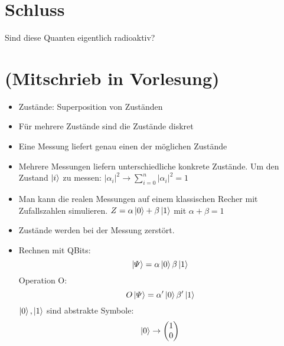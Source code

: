 \chapter{Schluss}
Sind diese Quanten eigentlich radioaktiv?
\chapter{(Mitschrieb in Vorlesung)}
\begin{itemize}
\item Zustände: Superposition von Zuständen
\item Für mehrere Zustände sind die Zustände diskret
\item Eine Messung liefert genau einen der möglichen Zustände
\item Mehrere Messungen liefern unterschiedliche konkrete Zustände. Um den Zustand $\ket{i}$ zu messen: $\left\lvert \alpha_i \right\rvert ^2 \rightarrow \sum_{i = 0}^{n} \left\lvert \alpha_i \right\rvert ^2 = 1$
\item Man kann die realen Messungen auf einem klassischen Recher mit Zufallszahlen simulieren.
$Z=\alpha\ket{0}+\beta\ket{1}$ mit $\alpha + \beta = 1$
\item Zustände werden bei der Messung zerstört.
\item Rechnen mit QBits: \\
$$
\ket{\varPsi} = \alpha\ket{0}\beta\ket{1}
$$
Operation O:
$$
O \ket{\varPsi} = \alpha'\ket{0}\beta'\ket{1}
$$
$\ket{0},\ket{1}$ sind abstrakte Symbole:
$$
\ket{0}\rightarrow \begin{pmatrix}
    1 \\ 0
\end{pmatrix}
$$
\end{itemize}

